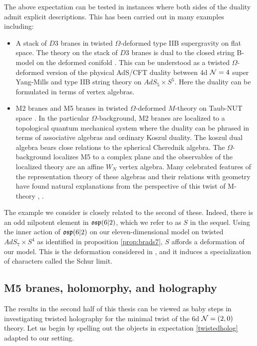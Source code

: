 \parsec[]
The above expectation can be tested in instances where both sides of the duality admit explicit descriptions. This has been carried out in many examples including:
\begin{itemize}
  \item A stack of $D3$ branes in twisted $\Omega$-deformed type IIB supergravity on flat space. The theory on the stack of $D3$ branes is dual to the closed string B-model on the deformed conifold \cite{costello2021twisted}. This can be understood as a twisted $\Omega$-deformed version of the physical AdS/CFT duality between 4d $\mathcal{N}=4$ super Yang-Mills and type IIB string theory on $AdS_{5}\times S^{5}$. Here the duality can be formulated in terms of vertex algebras. 
  
  \item M2 branes and M5 branes in twisted $\Omega$-deformed $M$-theory on Taub-NUT space \cite{CostelloM5,CostelloM2}. In the particular $\Omega$-background, M2 branes are localized to a topological quantum mechanical system where the duality can be phrased in terms of associative algebras and ordinary Koszul duality. The koszul dual algebra bears close relations to the spherical Cherednik algebra. The $\Omega$-background localizes M5 to a complex plane and the observables of the localized theory are an affine $W_{N}$ vertex algebra. Many celebrated features of the representation theory of these algebras and their relations with geometry have found natural explanations from the perspective of this twist of M-theory \cite{gaiotto2020miura}, \cite{Oh:2021wes}.
\end{itemize}

The example we consider is closely related to the second of these. Indeed, there is an odd nilpotent element in $\mathfrak{osp}(6|2)$, which we refer to as $S$ in the sequel. Using the inner action of $\mathfrak{osp}(6|2)$ on our eleven-dimensional model on twisted $AdS_7\times S^4$ as identified in proposition \ref{prop:brads7}, $S$ affords a deformation of our model. This is the deformation considered in \cite{BeemEtAl}, and it induces a specialization of characters called the Schur limit.
\parsec[]

\subsection{M5 branes, holomorphy, and holography}
The results in the second half of this thesis can be viewed as baby steps in investigating twisted holography for the minimal twist of the 6d $\mathcal{N}=(2,0)$ theory. Let us begin by spelling out the objects in expectation \ref{twistedholog} adapted to our setting. 


